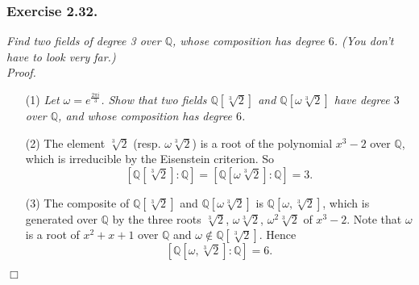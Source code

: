 \documentclass{article}
\begin{document}






\subsubsection*{Exercise 2.32.}
\emph{Find two fields of degree 3 over $\mathbb{Q}$,
whose composition has degree $6$.
(You don't have to look very far.)} \\



\emph{Proof.}
\begin{enumerate}
\item[(1)]
  \emph{Let $\omega = e^{\frac{2\pi i}{3}}$.
  Show that two fields $\mathbb{Q}[\sqrt[3]{2}]$ and $\mathbb{Q}[\omega \sqrt[3]{2}]$
  have degree $3$ over $\mathbb{Q}$, and whose composition has degree $6$.}

\item[(2)]
  The element $\sqrt[3]{2}$ (resp. $\omega \sqrt[3]{2}$) is a root of the polynomial
  $x^3 - 2$ over $\mathbb{Q}$, which is irreducible by the Eisenstein criterion.
  So
  \[
    [\mathbb{Q}[\sqrt[3]{2}]:\mathbb{Q}]
    = [\mathbb{Q}[\omega \sqrt[3]{2}]:\mathbb{Q}]
    = 3.
  \]

\item[(3)]
  The composite of $\mathbb{Q}[\sqrt[3]{2}]$ and $\mathbb{Q}[\omega \sqrt[3]{2}]$
  is $\mathbb{Q}[\omega, \sqrt[3]{2}]$,
  which is generated over $\mathbb{Q}$
  by the three roots $\sqrt[3]{2}$, $\omega\sqrt[3]{2}$, $\omega^2\sqrt[3]{2}$ of $x^3 - 2$.
  Note that $\omega$ is a root of $x^2+x+1$ over $\mathbb{Q}$ and
  $\omega \not\in \mathbb{Q}[\sqrt[3]{2}]$.
  Hence
  \[
    [\mathbb{Q}[\omega, \sqrt[3]{2}]:\mathbb{Q}] = 6.
  \]
\end{enumerate}
$\Box$ \\\\






\end{document}

